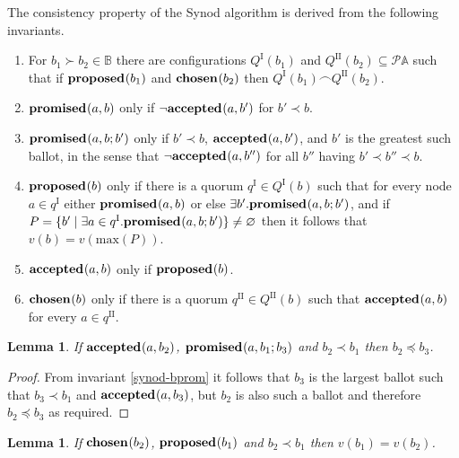 \documentclass[journal]{IEEEtran}
\newtheorem{lemma}[theorem]{Lemma}
\begin{document}
The consistency property of the Synod algorithm is derived from the following
invariants.

\begin{enumerate}

\item \label{synod-quorums} For $b_1 \succ b_2 \in \mathbb B$ there are
configurations $Q^\textrm{I}(b_1)$ and $Q^\textrm{II}(b_2) \subseteq \mathcal P
\mathbb A$ such that if $\mathbf{proposed}_{}(b_1)$ and $\mathbf{chosen}_{}(b_2)$ then
${Q^\textrm{I}(b_1) \frown Q^\textrm{II}(b_2)}$.

\item \label{synod-fprom} $\mathbf{promised}_{}(a,b)$ only if $\neg\mathbf{accepted}_{}(a,b')$ for ${b'
\prec b}$.

\item \label{synod-bprom} $\mathbf{promised}_{}(a,b;b')$ only if $b' \prec b$,
$\mathbf{accepted}_{}(a,b')$, and $b'$ is the greatest such ballot, in the sense that
$\neg\mathbf{accepted}_{}(a,b'')$ for all $b''$ having $b' \prec b'' \prec b$.

\item \label{synod-prop} $\mathbf{proposed}_{}(b)$ only if there is a quorum $q^\textrm{I}
\in Q^\textrm{I}(b)$ such that for every node $a \in q^\textrm{I}$ either
$\mathbf{promised}_{}(a,b)$ or else $\exists b'.  \mathbf{promised}_{}(a,b;b')$, and if ${P = \{ b'
\mid \exists a \in q^\textrm{I}. \mathbf{promised}_{}(a,b;b') \} \ne \varnothing}$ then
it follows that $v(b) = v(\mathrm{max}(P))$.

\item \label{synod-acc} $\mathbf{accepted}_{}(a,b)$ only if $\mathbf{proposed}_{}(b)$.

\item \label{synod-chosen} $\mathbf{chosen}_{}(b)$ only if there is a quorum
$q^\textrm{II} \in Q^\textrm{II}(b)$ such that $\mathbf{accepted}_{}(a,b)$ for every $a \in
q^\textrm{II}$.

\end{enumerate}

\begin{lemma}\label{synod-acc-bprom}If $\mathbf{accepted}_{}(a,b_2)$,
$\mathbf{promised}_{}(a,b_1;b_3)$ and $b_2 \prec b_1$ then $b_2 \preceq b_3$.\end{lemma}

\begin{proof} From invariant \ref{synod-bprom} it follows that $b_3$ is the
largest ballot such that $b_3 \prec b_1$ and $\mathbf{accepted}_{}(a,b_3)$, but $b_2$ is
also such a ballot and therefore $b_2 \preceq b_3$ as required.  \end{proof}

\begin{lemma}\label{synod-lemma} If $\mathbf{chosen}_{}(b_2)$, $\mathbf{proposed}_{}(b_1)$ and $b_2
\prec b_1$ then $v(b_1) = v(b_2)$. \end{lemma}
\end{document}
